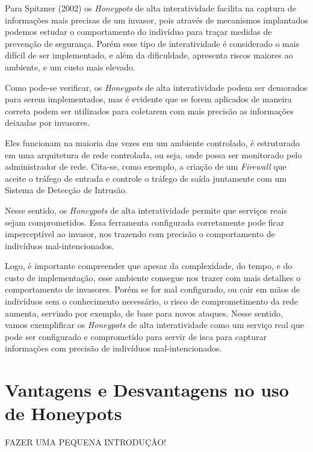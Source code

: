 Para Spitzner (2002) os \textit{Honeypots} de alta interatividade facilita na captura de informações mais precisas de um invasor, pois através de mecanismos implantados podemos estudar o comportamento do indivíduo para traçar medidas de prevenção de segurança. Porém esse tipo de interatividade é considerado o mais difícil de ser implementado, e além da dificuldade, apresenta riscos maiores ao ambiente, e um custo mais elevado.

Como pode-se verificar, os \textit{Honeypots} de alta interatividade podem ser demorados para serem implementados, mas é evidente que se forem aplicados de maneira correta podem ser utilizados para coletarem com mais precisão as informações deixadas por invasores.

Eles funcionam na maioria das vezes em um ambiente controlado, é estruturado em uma arquitetura de rede controlada, ou seja, onde possa ser monitorado pelo administrador de rede. Cita-se, como exemplo, a criação de um \textit{Firewall} que aceite o tráfego de entrada e controle o tráfego de saída juntamente com um Sistema de Detecção de Intrusão.

Nesse sentido, os \textit{Honeypots} de alta interatividade permite que serviços reais sejam comprometidos. Essa ferramenta configurada corretamente pode ficar imperceptível ao invasor, nos trazendo com precisão o comportamento de indivíduos mal-intencionados.

Logo, é importante compreender que apesar da complexidade, do tempo, e do custo de implementação, esse ambiente consegue nos trazer com mais detalhes o comportamento de invasores. Porém se for mal configurado, ou cair em mãos de indivíduos sem o conhecimento necessário, o risco de comprometimento da rede aumenta, servindo por exemplo, de base para novos ataques. Nesse sentido, vamos exemplificar os \textit{Honeypots} de alta interatividade como um serviço real que pode ser configurado e comprometido para servir de isca para capturar informações com precisão de indivíduos mal-intencionados.

\section{Vantagens e Desvantagens no uso de Honeypots}
FAZER UMA PEQUENA INTRODUÇÃO!
